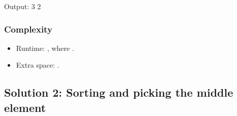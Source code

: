 \documentclass[letterpaper,12pt,english]{book}
\begin{document}
\begin{sphinxVerbatim}[commandchars=\\\{\}]
Output:
3
2
\end{sphinxVerbatim}


\subsubsection{Complexity}
\label{\detokenize{Sorting/04_SORT_169_Majority_Element:complexity}}\begin{itemize}
\item {} 
\sphinxAtStartPar
Runtime: , where .

\item {} 
\sphinxAtStartPar
Extra space: .

\end{itemize}


\subsection{Solution 2: Sorting and picking the middle element}
\label{\detokenize{Sorting/04_SORT_169_Majority_Element:solution-2-sorting-and-picking-the-middle-element}}
\end{document}
